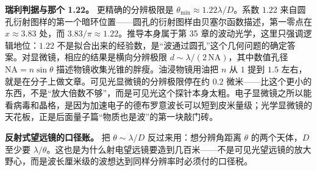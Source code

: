 \begin{challenge}
\textbf{瑞利判据与那个 1.22。} 更精确的分辨极限是 $\theta_{\min}\approx1.22\lambda/D$。系数 $1.22$ 来自圆孔衍射图样的第一个暗环位置——圆孔的衍射图样由贝塞尔函数描述，第一零点在 $x\approx3.83$ 处，而 $3.83/\pi\approx1.22$。推导本身属于第 35 章的波动光学，这里只强调逻辑地位：$1.22$ 不是拟合出来的经验数，是“波通过圆孔”这个几何问题的确定答案。对显微镜，相应的结果是横向分辨极限 $d\sim\lambda/(2\,\mathrm{NA})$，其中数值孔径 $\mathrm{NA}=n\sin\theta$ 描述物镜收集光锥的胖瘦。油浸物镜用油把 $n$ 从 $1$ 提到 $1.5$ 左右，就是在分子上做文章。可见光显微镜的分辨极限停在约 $0.2$ 微米——比这个更小的东西，不是“放大倍数不够”，而是可见光这个探针本身太粗。电子显微镜之所以能看病毒和晶格，是因为加速电子的德布罗意波长可以短到皮米量级；光学显微镜的天花板，正是后面量子篇“物质也是波”的第一块敲门砖。

\textbf{反射式望远镜的口径账。} 把 $\theta\sim\lambda/D$ 反过来用：想分辨角距离 $\theta$ 的两个天体，$D$ 至少要 $\lambda/\theta$。这也是为什么射电望远镜要造到几百米——不是可见光望远镜的放大野心，而是波长厘米级的波想达到同样分辨率时必须付的口径税。
\end{challenge}

